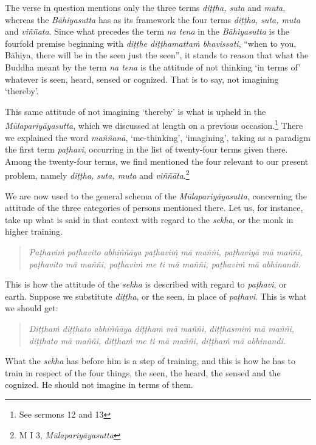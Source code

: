 The verse in question mentions only the three terms \emph{diṭṭha, suta} and \emph{muta}, whereas the \emph{Bāhiyasutta} has as its framework the four terms \emph{diṭṭha, suta, muta} and \emph{viññata}. Since what precedes the term \emph{na tena} in the \emph{Bāhiyasutta} is the fourfold premise beginning with \emph{diṭṭhe diṭṭhamattaṁ bhavissati}, ``when to you, Bāhiya, there will be in the seen just the seen'', it stands to reason that what the Buddha meant by the term \emph{na tena} is the attitude of not thinking `in terms of' whatever is seen, heard, sensed or cognized. That is to say, not imagining `thereby'.

This same attitude of not imagining `thereby' is what is upheld in the \emph{Mūlapariyāyasutta}, which we discussed at length on a previous occasion.\footnote{See sermons 12 and 13} There we explained the word \emph{maññanā}, `me-thinking', `imagining', taking as a paradigm the first term \emph{paṭhavi}, occurring in the list of twenty-four terms given there. Among the twenty-four terms, we find mentioned the four relevant to our present problem, namely \emph{diṭṭha, suta, muta} and \emph{viññāta}.\footnote{M I 3, \emph{Mūlapariyāyasutta}}

We are now used to the general schema of the \emph{Mūlapariyāyasutta}, concerning the attitude of the three categories of persons mentioned there. Let us, for instance, take up what is said in that context with regard to the \emph{sekha}, or the monk in higher training.

\begin{quote}
\emph{Paṭhaviṁ paṭhavito abhiññāya paṭhaviṁ mā maññi, paṭhaviyā mā maññi, paṭhavito mā maññi, paṭhaviṁ me ti mā maññi, paṭhaviṁ mā abhinandi.}
\end{quote}

This is how the attitude of the \emph{sekha} is described with regard to \emph{paṭhavi}, or earth. Suppose we substitute \emph{diṭṭha}, or the seen, in place of \emph{paṭhavi}. This is what we should get:

\begin{quote}
\emph{Diṭṭhaṁ diṭṭhato abhiññāya diṭṭhaṁ mā maññi, diṭṭhasmiṁ mā maññi, diṭṭhato mā maññi, diṭṭhaṁ me ti mā maññi, diṭṭhaṁ mā abhinandi.}
\end{quote}

What the \emph{sekha} has before him is a step of training, and this is how he has to train in respect of the four things, the seen, the heard, the sensed and the cognized. He should not imagine in terms of them.


